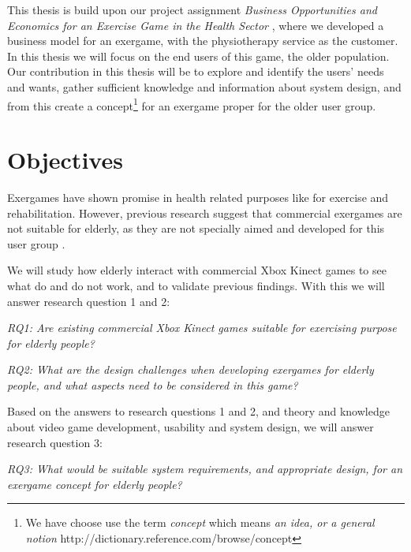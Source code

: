 This thesis is build upon our project assignment \emph{Business Opportunities and Economics for an Exercise Game in the Health Sector} \cite{project}, where we developed a business model for an exergame, with the physiotherapy service as the customer. In this thesis we will focus on the end users of this game, the older population. Our contribution in this thesis will be to explore and identify the users' needs and wants, gather sufficient knowledge and information about system design, and from this create a concept\footnote{We have choose use the term \emph{concept} which means \emph{an idea, or a general notion} http://dictionary.reference.com/browse/concept} for an exergame proper for the older user group.

\section{Objectives}
\label{sec:researchq} Exergames have shown promise in health related purposes like for exercise and rehabilitation. However, previous research suggest that commercial exergames are not suitable for elderly, as they are not specially aimed and developed for this user group \cite{exergamesforelderly} \cite{gerling2} \cite{bruin} \cite{project}. 

We will study how elderly interact with commercial Xbox Kinect games to see what do and do not work, and to validate previous findings. With this we will answer research question 1 and 2: 

\emph{RQ1: Are existing commercial Xbox Kinect games suitable for exercising purpose for elderly people?} 

\emph{RQ2: What are the design challenges when developing exergames for elderly people, and what aspects need to be considered in this game?}

Based on the answers to research questions 1 and 2, and theory and knowledge about video game development, usability and system design, we will answer research question 3:

\emph{RQ3: What would be suitable system requirements, and appropriate design, for an exergame concept for elderly people?}

